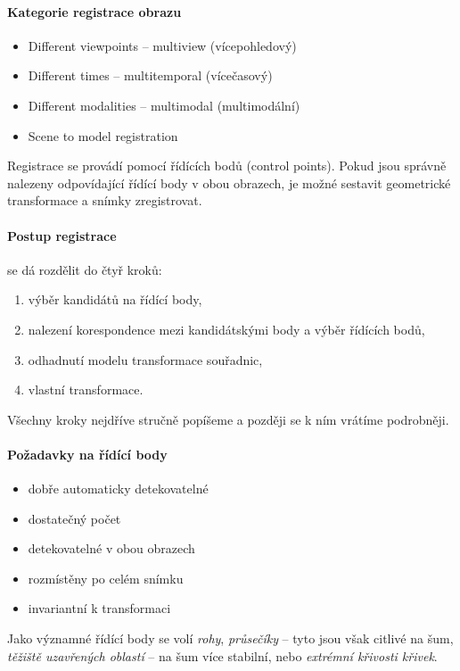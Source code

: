 \paragraph{Kategorie registrace obrazu}
\begin{itemize}
	\item Different viewpoints -- multiview (vícepohledový)
	\item Different times -- multitemporal (vícečasový)
	\item Different modalities -- multimodal (multimodální)
	\item Scene to model registration
\end{itemize}

Registrace se provádí pomocí řídících bodů (control points). Pokud jsou správně nalezeny odpovídající řídící body v obou
obrazech, je možné sestavit geometrické transformace a snímky zregistrovat.

\paragraph{Postup registrace} se dá rozdělit do čtyř kroků:
\begin{enumerate}
	\item výběr kandidátů na řídící body,
	\item nalezení korespondence mezi kandidátskými body a výběr řídících bodů,
	\item odhadnutí modelu transformace souřadnic,
	\item vlastní transformace.
\end{enumerate}
Všechny kroky nejdříve stručně popíšeme a později se k ním vrátíme podrobněji.

\paragraph{Požadavky na řídící body}
\begin{itemize}
\item dobře automaticky detekovatelné
\item dostatečný počet
\item detekovatelné v obou obrazech
\item rozmístěny po celém snímku
\item invariantní k transformaci
\end{itemize}

Jako významné řídící body se volí \emph{rohy}, \emph{průsečíky} -- tyto jsou však citlivé na šum, \emph{těžiště uzavřených 
oblastí} -- na šum více stabilní, nebo \emph{extrémní křivosti křivek}.

